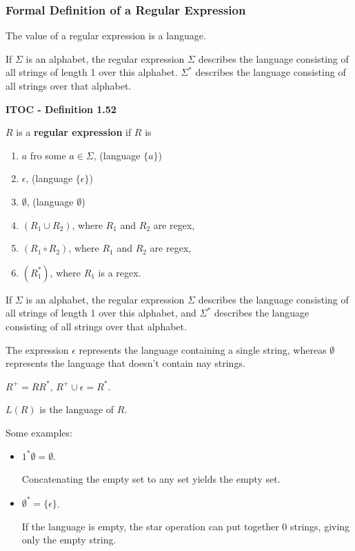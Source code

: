 \subsubsection{ Formal Definition of a Regular Expression}

The value of a regular expression is a language.

If $\Sigma$ is an alphabet, the regular expression $\Sigma$ describes the language consisting of all strings of length 1 over this alphabet. $\Sigma^*$ describes the language consisting of all strings over that alphabet.

\begin{shaded}
\textbf{ITOC - Definition 1.52}

\medskip
$R$ is a \textbf{regular expression} if $R$ is
\begin{enumerate}
\item $a$ fro some $a \in \Sigma$, (language $\{a\}$)
\item $\epsilon$, (language $\{\epsilon\}$)
\item $\emptyset$, (language $\emptyset$)
\item $(R_1 \cup R_2)$, where $R_1$ and $R_2$ are regex,
\item $(R_1 \circ R_2)$, where $R_1$ and $R_2$ are regex,
\item $(R_1^*)$, where $R_1$ is a regex.
\end{enumerate}
\end{shaded}

If $\Sigma$ is an alphabet, the regular expression $\Sigma$ describes the language consisting of all strings of length 1 over this alphabet, and $\Sigma^*$ describes the language consisting of all strings over that alphabet.

{\color{blue} The expression $\epsilon$  represents the language containing a single string, whereas $\emptyset$ represents the language that doesn't contain nay strings.}

$R^+ = RR^*$, $R^+ \cup \epsilon = R^*$. 

$L(R)$ is the language of $R$.

\medskip
Some examples:
\begin{itemize}
\item $1^*\emptyset = \emptyset$.

Concatenating the empty set to any set yields the empty set.

\item $\emptyset^* = \{\epsilon\}$. 

If the language is empty, the star operation can put together 0 strings, giving only the empty string.
\end{itemize}

